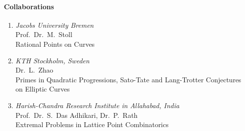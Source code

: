 \paragraph{Collaborations}
\begin{enumerate}
\item {\sl Jacobs University Bremen} \\
  Prof.~Dr.~M.~Stoll \\  
  Rational Points on Curves
\item {\sl KTH Stockholm, Sweden} \\ 
  Dr.~L.~Zhao \\ 
  Primes in Quadratic Progressions, Sato-Tate and Lang-Trotter Conjectures 
  on Elliptic Curves
\item {\sl Harish-Chandra Research Institute in Allahabad, India} \\
  Prof.~Dr.~S.~Das Adhikari, Dr.~P.~Rath \\  
  Extremal Problems in Lattice Point Combinatorics
\end{enumerate}

